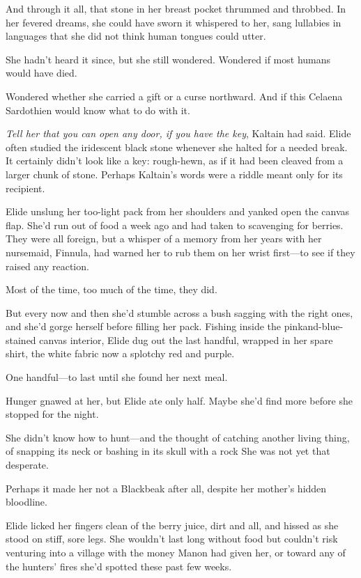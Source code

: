 And through it all, that stone in her breast pocket thrummed and throbbed.
In her fevered dreams, she could have sworn it whispered to her, sang lullabies in languages that she did not think human tongues could utter.

She hadn't heard it since, but she still wondered.
Wondered if most humans would have died.

Wondered whether she carried a gift or a curse northward.
And if this Celaena Sardothien would know what to do with it.

\emph{Tell her that you can open any door, if you have the key}, Kaltain had said.
Elide often studied the iridescent black stone whenever she halted for a needed break.
It certainly didn't look like a key:
rough-hewn, as if it had been cleaved from a larger chunk of stone.
Perhaps Kaltain's words were a riddle meant only for its recipient.

Elide unslung her too-light pack from her shoulders and yanked open the canvas flap.
She'd run out of food a week ago and had taken to scavenging for berries.
They were all foreign, but a whisper of a memory from her years with her nursemaid, Finnula, had warned her to rub them on her wrist first---to see if they raised any reaction.

Most of the time, too much of the time, they did.

But every now and then she'd stumble across a bush sagging with the right ones, and she'd gorge herself before filling her pack.
Fishing inside the pinkand-blue-stained canvas interior, Elide dug out the last handful, wrapped in her spare shirt, the white fabric now a splotchy red and purple.

One handful---to last until she found her next meal.

Hunger gnawed at her, but Elide ate only half.
Maybe she'd find more before she stopped for the night.

She didn't know how to hunt---and the thought of catching another living thing, of snapping its neck or bashing in its skull with a rock 
She was not yet that desperate.

Perhaps it made her not a Blackbeak after all, despite her mother's hidden bloodline.

Elide licked her fingers clean of the berry juice, dirt and all, and hissed as she stood on stiff, sore legs.
She wouldn't last long without food but couldn't risk venturing into a village with the money Manon had given her, or toward any of the hunters' fires she'd spotted these past few weeks.

